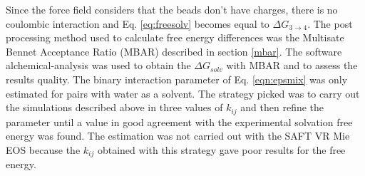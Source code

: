 Since the force field considers that the beads don't have charges, there is no coulombic interaction and Eq. \eqref{eq:freesolv} becomes equal to $\Delta G_{3 \rightarrow 4} $. The post processing method used to calculate free energy differences was the Multisate Bennet Acceptance Ratio (MBAR) described in section \ref{mbar}. The software alchemical-analysis \cite{klimovich} was used to obtain the $\Delta G_{solv}$ with MBAR and to assess the results quality. The binary interaction  parameter of Eq. \eqref{eqn:epsmix} was only estimated for pairs with water as a solvent. The strategy picked was to carry out the simulations described above in three values of $k_{ij}$ and then refine the parameter until a value in good agreement with the experimental solvation free energy was found. The estimation was not carried out with the SAFT VR Mie EOS because the $k_{ij}$ obtained  with this strategy gave poor results for the free energy.




